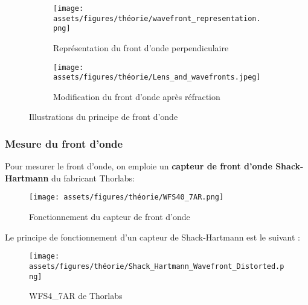 \begin{figure}[H]
  \centering
  \begin{subfigure}{.5\textwidth}
    \centering
    \texttt{[image: assets/figures/théorie/wavefront\_representation.png]}
    \caption{Représentation du front d'onde perpendiculaire}
    \label{fig:front_onde_perp}
  \end{subfigure}%
  \begin{subfigure}{.5\textwidth}
    \centering
    \texttt{[image: assets/figures/théorie/Lens\_and\_wavefronts.jpeg]}
    \caption{Modification du front d'onde après réfraction}
    \label{fig:refraction_front_onde}
  \end{subfigure}
  \caption[Illustration front d'onde]{Illustrations du principe de front d'onde \cite{wavefront_wikipedia}\footnotemark}
  \label{fig:illu_front_onde}
\end{figure}

\subsubsection{Mesure du front d'onde}

Pour mesurer le front d'onde, on emploie un \textbf{capteur de front d'onde Shack-Hartmann} du fabricant Thorlabs:

\begin{figure}[H]
  \centering
  \texttt{[image: assets/figures/théorie/WFS40\_7AR.png]}
  \caption[Fonctionnement WFS Thorlabs]{Fonctionnement du capteur de front d'onde\cite{WFS_thorlabs_site}\footnotemark}
  \label{fig:WFS_thorlabs_fonctionnement}
\end{figure}


Le principe de fonctionnement d'un capteur de Shack-Hartmann est le suivant :

\begin{figure}[H]
  \centering
  \texttt{[image: assets/figures/théorie/Shack\_Hartmann\_Wavefront\_Distorted.png]}
  \caption[Image WFS Thorlabs]{WFS4\_7AR de Thorlabs\cite{WFS_thorlabs_site}\footnotemark}
  \label{fig:WFS_thorlabs}
\end{figure}

\footnotemark[5]

